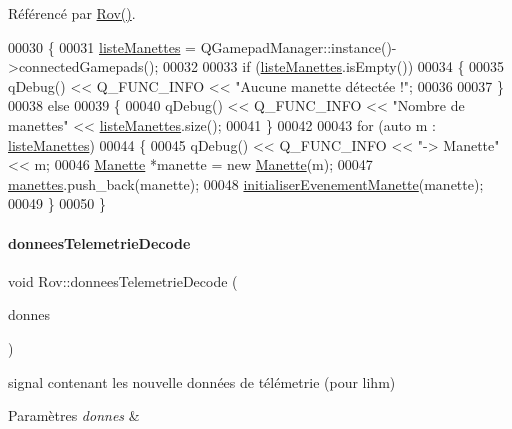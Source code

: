 Référencé par \hyperlink{rov_8cpp_source_l00011}{Rov()}.


\begin{DoxyCode}
00030 \{
00031     \hyperlink{class_rov_ac3bf6c7552073bd2d780e005205919a9}{listeManettes} = QGamepadManager::instance()->connectedGamepads();
00032 
00033     \textcolor{keywordflow}{if} (\hyperlink{class_rov_ac3bf6c7552073bd2d780e005205919a9}{listeManettes}.isEmpty())
00034     \{
00035         qDebug() << Q\_FUNC\_INFO << \textcolor{stringliteral}{"Aucune manette détectée !"};
00036 
00037     \}
00038     \textcolor{keywordflow}{else}
00039     \{
00040         qDebug() << Q\_FUNC\_INFO << \textcolor{stringliteral}{"Nombre de manettes"} << \hyperlink{class_rov_ac3bf6c7552073bd2d780e005205919a9}{listeManettes}.size();
00041     \}
00042 
00043     \textcolor{keywordflow}{for} (\textcolor{keyword}{auto} m : \hyperlink{class_rov_ac3bf6c7552073bd2d780e005205919a9}{listeManettes})
00044     \{
00045         qDebug() << Q\_FUNC\_INFO << \textcolor{stringliteral}{"-> Manette"} << m;
00046         \hyperlink{class_manette}{Manette} *manette = \textcolor{keyword}{new} \hyperlink{class_manette}{Manette}(m);
00047         \hyperlink{class_rov_a58ea20dc3615a732b87ac381bf1c0a83}{manettes}.push\_back(manette);
00048         \hyperlink{class_rov_a0d1863d7d230c0153253d7d2689429b5}{initialiserEvenementManette}(manette);
00049     \}
00050 \}
\end{DoxyCode}
\mbox{\label{class_rov_ae868f3f3d691fcd6ecb97ee770541475}} 
\paragraph{\texorpdfstring{donnees\+Telemetrie\+Decode}{donneesTelemetrieDecode}}
{\footnotesize\ttfamily void Rov\+::donnees\+Telemetrie\+Decode (\begin{DoxyParamCaption}\item[{Q\+String}]{donnes }\end{DoxyParamCaption})\hspace{0.3cm}{\ttfamily [signal]}}



signal contenant les nouvelle données de télémetrie (pour l\textquotesingle{}ihm) 


\begin{DoxyParams}{Paramètres}
{\em donnes} & \\
\hline
\end{DoxyParams}
\mbox{\label{class_rov_a180b955cc5ee7e01196299377e0c5f33}} 

